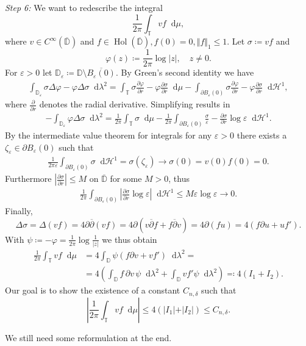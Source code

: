\documentclass[letterpaper, 11pt]{article}
\newcommand{\D}{\mathbb{D}}
\newcommand{\T}{\mathbb{T}}
\newcommand{\1}{\mathds{1}}
\newcommand{\dd}{\mathop{}\!\mathrm{d}}
\newcommand{\cl}[1]{\overline{#1}}
\newcommand{\wirtz}{\partial}
\newcommand{\wirtzbar}{\overline{\partial}}
\DeclareMathOperator*{\Hol}{Hol}
\newcommand{\todo}[1][Todo.]{{\color{red} #1}}
\theoremstyle{definition}
\newenvironment{innerproof}
 {\renewcommand{\qedsymbol}{}\proof}
 {\endproof}
\begin{document}
  \begin{innerproof}[Proof (continued)] \textit{Step 6:} We want to redescribe the integral
  $$ \frac{1}{2\pi} \int_\T v f \dd \mu, $$
  where $v \in C^\infty(\cl{\D})$ and $f \in \Hol(\cl{\D}), f(0) = 0, \Vert f \Vert_1 \leq 1$. Let $\sigma \coloneqq v f$ and
  $$ \varphi(z) \coloneqq \frac{1}{2\pi} \log \vert z \vert, \quad z \neq 0. $$
  For $\varepsilon > 0$ let $\D_\varepsilon \coloneqq \D \setminus \cl{B_\varepsilon(0)}$. By Green's second identity we have
  \begin{align*}
    \int_{\D_\varepsilon} \sigma \Delta \varphi - \varphi \Delta \sigma \dd \lambda^2 = \int_\T \sigma \frac{\partial \varphi}{\partial r} - \varphi \frac{\partial \sigma}{\partial r} \dd \mu - \int_{\partial B_\varepsilon(0)} \sigma \frac{\partial \varphi}{\partial r} - \varphi \frac{\partial \sigma}{\partial r} \dd \mathcal{H}^1,
  \end{align*}
  where $\frac{\partial}{\partial r}$ denotes the radial derivative. Simplifying results in
  \begin{align*}
    -\int_{\D_\varepsilon} \varphi \Delta \sigma \dd \lambda^2 = \frac{1}{2 \pi} \int_\T \sigma \dd \mu - \frac{1}{2 \pi} \int_{\partial B_\varepsilon(0)} \frac{\sigma}{\varepsilon} - \frac{\partial \sigma}{\partial r} \log \varepsilon \dd \mathcal{H}^1.
  \end{align*}
  By the intermediate value theorem for integrals for any $\varepsilon > 0$ there exists a $\zeta_\varepsilon \in \partial B_\varepsilon(0)$ such that
  \begin{align*}
    \frac{1}{2\pi\varepsilon} \int_{\partial B_\varepsilon(0)} \sigma \dd \mathcal{H}^1 = \sigma(\zeta_\varepsilon) \to \sigma(0) = v(0) f(0) = 0.
  \end{align*}
  Furthermore $\left\vert \frac{\partial \sigma}{\partial r} \right\vert \leq M$ on $\cl{\D}$ for some $M > 0$, thus
  \begin{align*}
    \frac{1}{2\pi} \int_{\partial B_\varepsilon(0)} \left\vert \frac{\partial \sigma}{\partial r} \log \varepsilon \right\vert \dd \mathcal{H}^1 \leq M \varepsilon \log \varepsilon \to 0.
  \end{align*}
  Finally,
  $$ \Delta \sigma = \Delta (v f) = 4 \wirtz \wirtzbar (v f) = 4 \wirtz (v \wirtzbar f + f \wirtzbar v) = 4\wirtz(f u) = 4(f \partial u + u f'). $$
  With $\psi \coloneqq -\varphi = \frac{1}{2\pi} \log \frac{1}{\vert z \vert}$ we thus obtain
  \begin{align*}
    \frac{1}{2 \pi} \int_\T v f \dd \mu &= 4 \int_\D \psi \left( f \partial v + v f' \right) \dd \lambda^2 = \\ 
    &= 4 \left( \int_\D f \, \partial v \, \psi \dd \lambda^2 + \int_\D v f' \psi \dd \lambda^2 \right) \eqqcolon 4 (I_1 + I_2).
  \end{align*}
  Our goal is to show the existence of a constant $C_{n,\delta}$ such that
  $$ \left\vert \frac{1}{2 \pi} \int_\T v f \dd \mu \right\vert \leq 4 (\vert I_1 \vert + \vert I_2 \vert) \leq C_{n,\delta}. $$

  \todo[We still need some reformulation at the end.]
\end{innerproof}
\end{document}
